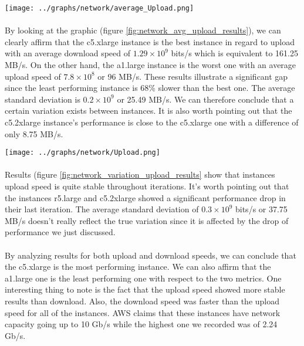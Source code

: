 \documentclass[11pt]{article}
\begin{document}
		\begin{center}
			\begin{minipage}{0.6\textwidth}
				 \label{fig:network_avg_upload_results}
				\texttt{[image: ../graphs/network/average\_Upload.png]}
			\end{minipage}
		\end{center}

		\paragraph{} By looking at the graphic (figure
		\ref{fig:network_avg_upload_results}), we can clearly affirm that the
		c5.xlarge instance is the best instance in regard to upload with an
		average download speed of \(1.29 \times 10^9\) bits/s which is
		equivalent to 161.25 MB/s. On the other hand, the a1.large instance is
		the worst one with an average upload speed of \(7.8 \times 10^8\) or 96
		MB/s. These results illustrate a significant gap since the least
		performing instance is 68\% slower than the best one. The average
		standard  deviation is \(0.2 \times 10^9\) or 25.49 MB/s. We can
		therefore conclude that a certain variation exists between instances. It is
		also worth pointing out that the c5.2xlarge instance's performance is
		close to the c5.xlarge one with a difference of only 8.75 MB/s.

		\begin{center}
			\begin{minipage}{0.6\textwidth}
				 \label{fig:network_variation_upload_results}
				\texttt{[image: ../graphs/network/Upload.png]}
			\end{minipage}
		\end{center}

		\paragraph{} Results (figure \ref{fig:network_variation_upload_results}
		show that instances upload speed is quite stable throughout iterations.
		It's worth pointing out that the instances r5.large and c5.2xlarge showed
		a significant performance drop in their last iteration. The average
		standard deviation of \(0.3 \times 10^9\) bits/s or 37.75 MB/s doesn’t really reflect
		the true variation since it is affected by the drop of performance we
		just discussed. 

		\paragraph{} By analyzing results for both upload and download speeds,
		we can conclude that the c5.xlarge is the most performing instance. We can
		also affirm that the a1.large one is the least performing one with
		respect to the two metrics. One interesting thing to note is the fact
		that the upload speed showed more stable results than download. Also,
		the download speed was faster than the upload speed for all of the
		instances. AWS claims that these instances have network capacity going
		up to 10 Gb/s while the highest one we recorded was of 2.24 Gb/s.
		
\end{document}

